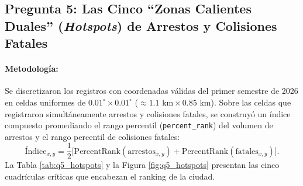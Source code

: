 \documentclass[11pt,a4paper]{article}
\begin{document}
\subsection{Pregunta 5: Las Cinco ``Zonas Calientes Duales'' (\textit{Hotspots}) de Arrestos y Colisiones Fatales}
\label{subsec:respuesta_q5}

\paragraph{Metodología:} Se discretizaron los registros con coordenadas válidas del primer semestre de 2026 en celdas uniformes de $0.01^\circ \times 0.01^\circ$ ($\approx 1.1\text{ km} \times 0.85\text{ km}$). Sobre las celdas que registraron simultáneamente arrestos y colisiones fatales, se construyó un índice compuesto promediando el rango percentil (\texttt{percent\_rank}) del volumen de arrestos y el rango percentil de colisiones fatales:
\[
\text{Índice}_{x,y} = \frac{1}{2}\Big[\text{PercentRank}(\text{arrestos}_{x,y}) + \text{PercentRank}(\text{fatales}_{x,y})\Big].
\]
La Tabla \ref{tab:q5_hotspots} y la Figura \ref{fig:q5_hotspots} presentan las cinco cuadrículas críticas que encabezan el ranking de la ciudad.

\begin{table}[H]
\centering
\scriptsize
\renewcommand{\arraystretch}{1.2}
\caption{Top 5 de cuadrículas urbanas ($0.01^\circ \times 0.01^\circ$) con mayor concentración conjunta de arrestos y colisiones fatales (2026-I).}
\label{tab:q5_hotspots}
\end{table}
\end{document}
